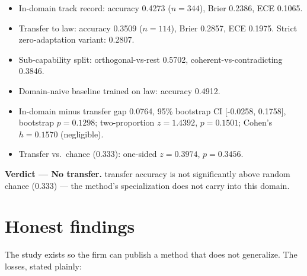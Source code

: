 \documentclass[11pt]{article}
\begin{document}
\begin{itemize}

\item In-domain track record: accuracy 0.4273 ($n=344$), Brier 0.2386, ECE 0.1065.

\item Transfer to law: accuracy 0.3509 ($n=114$), Brier 0.2857, ECE 0.1975. Strict zero-adaptation variant: 0.2807.

\item Sub-capability split: orthogonal-vs-rest 0.5702, coherent-vs-contradicting 0.3846.

\item Domain-naive baseline trained on law: accuracy 0.4912.

\item In-domain minus transfer gap 0.0764, 95\% bootstrap CI [-0.0258, 0.1758], bootstrap $p=0.1298$; two-proportion $z=1.4392$, $p=0.1501$; Cohen's $h=0.1570$ (negligible).

\item Transfer vs.\ chance (0.333): one-sided $z=0.3974$, $p=0.3456$.

\end{itemize}

\noindent\textbf{Verdict --- No transfer.} transfer accuracy is not significantly above random chance (0.333) --- the method's specialization does not carry into this domain.

\section{Honest findings}

The study exists so the firm can publish a method that does not generalize. The losses, stated plainly:
\end{document}
